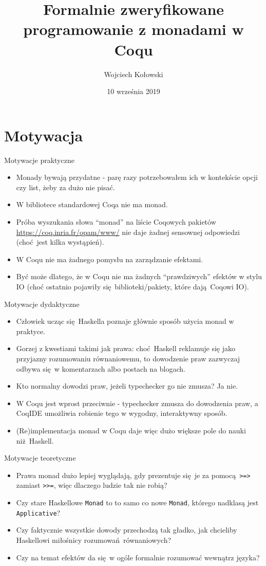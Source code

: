 \documentclass{beamer}
\title{Formalnie zweryfikowane programowanie z monadami w Coqu}
\author{Wojciech Kołowski}
\date{10 września 2019}
\begin{document}
\frame{\titlepage}

\frame{\tableofcontents}

\section{Motywacja}

\begin{frame}{Motywacje praktyczne}
\begin{itemize}
	\item Monady bywają przydatne - parę razy potrzebowałem ich w kontekście opcji czy list, żeby za dużo nie pisać.
	\item W bibliotece standardowej Coqa nie ma monad.
	\item Próba wyszukania słowa ``monad'' na liście Coqowych pakietów \url{https://coq.inria.fr/opam/www/} nie daje żadnej sensownej odpowiedzi (choć jest kilka wystąpień).
	\item W Coqu nie ma żadnego pomysłu na zarządzanie efektami.
	\item Być może dlatego, że w Coqu nie ma żadnych ``prawdziwych'' efektów w stylu IO (choć ostatnio pojawiły się biblioteki/pakiety, które dają Coqowi IO).
\end{itemize}
\end{frame}

\begin{frame}{Motywacje dydaktyczne}
\begin{itemize}
	\item Człowiek ucząc się Haskella poznaje głównie sposób użycia monad w praktyce.
	\item Gorzej z kwestiami takimi jak prawa: choć Haskell reklamuje się jako przyjazny rozumowaniu równaniowemu, to dowodzenie praw zazwyczaj odbywa się w komentarzach albo postach na blogach.
	\item Kto normalny dowodzi praw, jeżeli typechecker go nie zmusza? Ja nie.
	\item W Coqu jest wprost przeciwnie - typechecker zmusza do dowodzenia praw, a CoqIDE umożliwia robienie tego w wygodny, interaktywny sposób.
	\item (Re)implementacja monad w Coqu daje więc dużo większe pole do nauki niż Haskell.
\end{itemize}
\end{frame}

\begin{frame}{Motywacje teoretyczne}
\begin{itemize}
	\item Prawa monad dużo lepiej wyglądają, gdy prezentuje się je za pomocą \texttt{>=>} zamiast \texttt{>>=}, więc dlaczego ludzie tak nie robią?
	\item Czy stare Haskellowe \texttt{Monad} to to samo co nowe \texttt{Monad}, którego nadklasą jest \texttt{Applicative}?
	\item Czy faktycznie wszystkie dowody przechodzą tak gładko, jak chcieliby Haskellowi miłośnicy rozumowań równaniowych?
	\item Czy na temat efektów da się w ogóle formalnie rozumować wewnątrz języka?
\end{itemize}
\end{frame}
\end{document}

